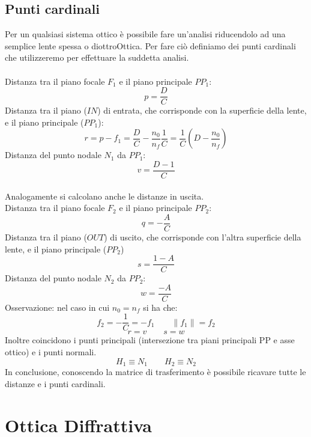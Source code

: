 \documentclass{article}
\begin{document}
\subsection*{Punti cardinali}
Per un qualsiasi sistema ottico è possibile fare un'analisi riducendolo ad una semplice lente spessa o diottroOttica. Per fare ciò definiamo dei punti cardinali che utilizzeremo per effettuare la suddetta analisi.\\
\\
Distanza tra il piano focale $F_1$ e il piano principale $PP_1$:
\begin{equation*}
p = \frac{D}{C}
\end{equation*}
Distanza tra il piano ($IN$) di entrata, che corrisponde con la superficie della lente, e il piano principale ($PP_1$):
\begin{equation*}
r = p - f_1 = \frac{D}{C} - \frac{n_0}{n_f} \frac{1}{C} = \frac{1}{C} \left(D - \frac{n_0}{n_f} \right)
\end{equation*}
Distanza del punto nodale $N_1$ da $PP_1$:
\begin{equation*}
v = \frac{D-1}{C}
\end{equation*}
\\
Analogamente si calcolano anche le distanze in uscita.\\
Distanza tra il piano focale $F_2$ e il piano principale $PP_2$:
\begin{equation*}
q = - \frac{A}{C}
\end{equation*}
Distanza tra il piano ($OUT$) di uscito, che corrisponde con l'altra superficie della lente, e il piano principale ($PP_2$)
\begin{equation*}
s = \frac{1-A}{C}
\end{equation*}
Distanza del punto nodale $N_2$ da $PP_2$:
\begin{equation*}
w = \frac{-A}{C}
\end{equation*}
Osservazione: nel caso in cui $n_0 = n_f$ si ha che:
\begin{equation*}
f_2 = - \frac{1}{C} = - f_1 \qquad \|f_1\| = f_2
\end{equation*}
\begin{equation*}
r = v \qquad s = w
\end{equation*}
Inoltre coincidono i punti principali (intersezione tra piani principali PP e asse ottico) e i punti normali.
\begin{equation*}
H_1 \equiv N_1 \qquad H_2 \equiv N_2
\end{equation*}
In conclusione, conoscendo la matrice di trasferimento è possibile ricavare tutte le distanze e i punti cardinali.
\newpage

\section*{Ottica Diffrattiva}
\end{document}
